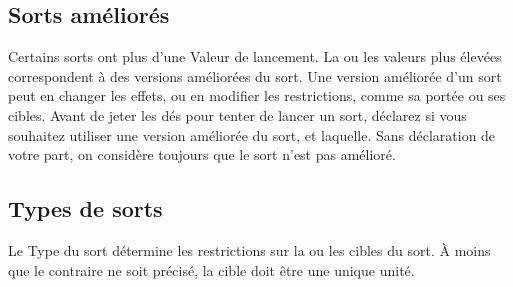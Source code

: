 \subsection{Sorts améliorés}
\label{boosted_spells}

Certains sorts ont plus d'une Valeur de lancement. La ou les valeurs plus élevées correspondent à des versions améliorées du sort. Une version améliorée d'un sort peut en changer les effets, ou en modifier les restrictions, comme sa portée ou ses cibles. Avant de jeter les dés pour tenter de lancer un sort, déclarez si vous souhaitez utiliser une version améliorée du sort, et laquelle. Sans déclaration de votre part, on considère toujours que le sort n'est pas amélioré.

\subsection{Types de sorts}
\label{spell_types}

Le Type du sort détermine les restrictions sur la ou les cibles du sort. À moins que le contraire ne soit précisé, la cible doit être une unique unité.

\paragraph{\augment}


\paragraph{\aura}


\paragraph{\damage}


\paragraph{\direct}

